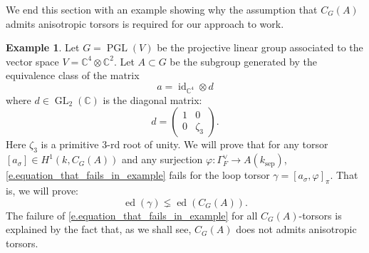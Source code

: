 \documentclass[12pt]{amsart}
\numberwithin{equation}{section}
\theoremstyle{definition}
\newtheorem{example}[theorem]{Example}
\newcommand{\bC}{\mathbb{C}}
\newcommand{\id}{\operatorname{id}}
\newcommand{\PGL}{\operatorname{PGL}}
\newcommand{\GL}{\operatorname{GL}}
\newcommand{\ed}{\operatorname{ed}}
\newcommand{\sep}{\operatorname{sep}}
\newcommand{\ksep}{k_{\sep}}
\newcommand{\vphi}{\varphi}
\newcommand{\I}[1]{\Gamma_{#1}^{\vee}}
\begin{document}
We end this section with an example showing why the assumption that $C_G(A)$ admits anisotropic torsors is required for our approach to work.
\begin{example}
    Let $G = \PGL(V)$ be the projective linear group associated to the vector space $V = \bC^4 \otimes \bC^2$. Let $A\subset G$ be the subgroup generated by the equivalence class of the matrix $$a = \id_{\bC^4} \otimes d$$ where $d \in \GL_2(\bC)$ is the diagonal matrix:
    $$d = \begin{pmatrix} 1 & 0 \\ 0 & \zeta_3 \end{pmatrix}.$$
    Here $\zeta_3$ is a primitive $3$-rd root of unity. We will prove that for any torsor $[a_\sigma]\in H^1(k,C_G(A))$ and any surjection $\vphi: \I{F} \to A(\ksep)$, \eqref{e.equation_that_fails_in_example} fails for the loop torsor $\gamma= [a_\sigma,\vphi]_\pi$. That is, we will prove:
    $$\ed(\gamma) \lneq \ed(C_G(A)).$$
    The failure of \eqref{e.equation_that_fails_in_example} for all $C_G(A)$-torsors is explained by the fact that, as we shall see, $C_G(A)$ does not admits anisotropic torsors.
    

\end{example}
\end{document}
